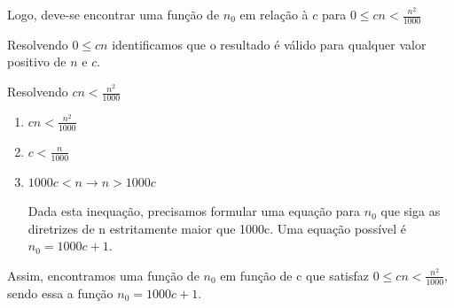 \documentclass[ a4paper, twocolumn]{article}
\theoremstyle{definition}
\begin{document}
Logo, deve-se encontrar uma função de $n_0$ em relação à $c$ para $0 \leq cn < \frac{n^2}{1000}$

Resolvendo $0 \leq cn$ identificamos que o resultado é válido para qualquer valor positivo de $n$ e $c$.

Resolvendo $cn < \frac{n^2}{1000}$

\begin{enumerate}[Step 1:]
	\item $cn < \frac{n^2}{1000}$
	\item $c < \frac{n}{1000}$
	\item $1000c < n \rightarrow n > 1000c$
	
	Dada esta inequação, precisamos formular uma equação para $n_0$ que siga as diretrizes de n estritamente maior que 1000c. Uma equação possível é $n_0 = 1000c + 1$.
\end{enumerate}
Assim, encontramos uma função de $n_0$ em função de c que satisfaz  $0 \leq cn < \frac{n^2}{1000}$, sendo essa a função $n_0 = 1000c + 1$.
\end{document}
